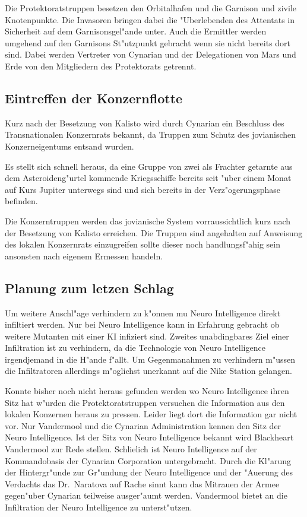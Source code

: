 Die Protektoratstruppen besetzen den Orbitalhafen und die Garnison und zivile Knotenpunkte. Die Invasoren bringen dabei die "Uberlebenden des Attentats in Sicherheit auf dem Garnisonsgel"ande unter. Auch die Ermittler werden umgehend auf den Garnisons St"utzpunkt gebracht wenn sie nicht bereits dort sind. Dabei werden Vertreter von Cynarian und der Delegationen von Mars und Erde von den Mitgliedern des Protektorats getrennt.

\subsection{Eintreffen der Konzernflotte}

Kurz nach der Besetzung von Kalisto wird durch Cynarian ein Beschluss des Transnationalen Konzernrats bekannt, da\3 Truppen zum Schutz des jovianischen Konzerneigentums entsand wurden.

Es stellt sich schnell heraus, da\3 eine Gruppe von zwei als Frachter getarnte aus dem Asteroideng"urtel kommende Kriegsschiffe bereits seit "uber einem Monat auf Kurs Jupiter unterwegs sind und sich bereits in der Verz"ogerungsphase befinden.

Die Konzerntruppen werden das jovianische System vorraussichtlich kurz nach der Besetzung von Kalisto erreichen. Die Truppen sind angehalten auf Anweisung des lokalen Konzernrats einzugreifen sollte dieser noch handlungsf"ahig sein ansonsten nach eigenem Ermessen handeln.

\subsection{Planung zum letzen Schlag}

Um weitere Anschl"age verhindern zu k"onnen mu\3 Neuro Intelligence direkt infiltiert werden. Nur bei Neuro Intelligence kann in Erfahrung gebracht ob weitere Mutanten mit einer KI infiziert sind. Zweites unabdingbares Ziel einer Infiltration ist zu verhindern, da\3 die Technologie von Neuro Intelligence irgendjemand in die H"ande f"allt. Um Gegenma\3nahmen zu verhindern m"ussen die Infiltratoren allerdings m"oglichst unerkannt auf die Nike Station gelangen.

Konnte bisher noch nicht heraus gefunden werden wo Neuro Intelligence ihren Sitz hat w"urden die Protektoratstruppen versuchen die Information aus den lokalen Konzernen heraus zu pressen. Leider liegt dort die Information gar nicht vor. Nur Vandermool und die Cynarian Administration kennen den Sitz der Neuro Intelligence. Ist der Sitz von Neuro Intelligence bekannt wird Blackheart Vandermool zur Rede stellen. Schlie\3lich ist Neuro Intelligence auf der Kommandobasis der Cynarian Corporation untergebracht. Durch die Kl"arung der Hintergr"unde zur Gr"undung der Neuro Intelligence und der "Au\3erung des Verdachts das Dr.~Naratova auf Rache sinnt kann das Mi\3trauen der Armee gegen"uber Cynarian teilweise ausger"aumt werden. Vandermool bietet an die Infiltration der Neuro Intelligence zu unterst"utzen.

